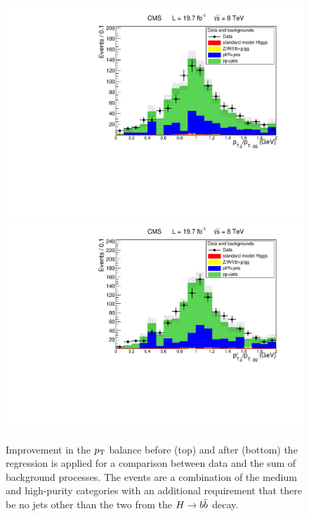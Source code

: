 \begin{figure}[ht]
\begin{center}
\includegraphics[width=.7\textwidth]{figures/objects/pt_balance_datavsmc_before.pdf}
\includegraphics[width=.7\textwidth]{figures/objects/pt_balance_datavsmc_after.pdf}
\end{center}
\caption{Improvement in the $p_{\rm T}$ balance before (top) and after (bottom) the regression is
applied for a comparison between data and the sum of background processes. The events are a combination
of the medium and high-purity categories with an additional requirement that there be no jets other than
the two from the $H\to b\bar{b}$ decay.}
\label{fig:regression_validation_datavsmc} 
\end{figure}
